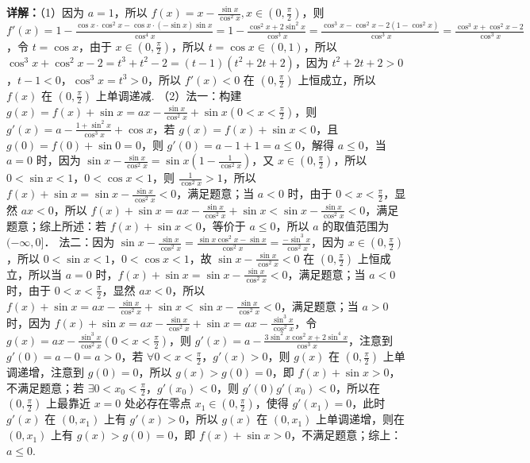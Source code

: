\begin{question}
\begin{solution}
\textbf{详解：}（1）因为 $a=1$，所以 $f(x)=x-\frac{\sin x}{\cos^2 x}, x\in(0,\frac{\pi}{2})$，则 $f'(x)=1-\frac{\cos x\cdot\cos^2 x-\cos x\cdot(-\sin x)\sin x}{\cos^4 x}=1-\frac{\cos^2 x+2\sin^2 x}{\cos^3 x}=\frac{\cos^3 x-\cos^2 x-2(1-\cos^2 x)}{\cos^3 x}=\frac{\cos^3 x+\cos^2 x-2}{\cos^3 x}$，令 $t=\cos x$，由于 $x\in(0,\frac{\pi}{2})$，所以 $t=\cos x\in(0,1)$，所以 $\cos^3 x+\cos^2 x-2=t^3+t^2-2=(t-1)(t^2+2t+2)$，因为 $t^2+2t+2>0$，$t-1<0$，$\cos^3 x=t^3>0$，所以 $f'(x)<0$ 在 $(0,\frac{\pi}{2})$ 上恒成立，所以 $f(x)$ 在 $(0,\frac{\pi}{2})$ 上单调递减.
（2）法一：构建 $g(x)=f(x)+\sin x=ax-\frac{\sin x}{\cos^2 x}+\sin x(0<x<\frac{\pi}{2})$，则 $g'(x)=a-\frac{1+\sin^2 x}{\cos^3 x}+\cos x$，若 $g(x)=f(x)+\sin x<0$，且 $g(0)=f(0)+\sin0=0$，则 $g'(0)=a-1+1=a\le0$，解得 $a\le0$，当 $a=0$ 时，因为 $\sin x-\frac{\sin x}{\cos^2 x}=\sin x\left(1-\frac{1}{\cos^2 x}\right)$，又 $x\in(0,\frac{\pi}{2})$，所以 $0<\sin x<1$，$0<\cos x<1$，则 $\frac{1}{\cos^2 x}>1$，所以 $f(x)+\sin x=\sin x-\frac{\sin x}{\cos^2 x}<0$，满足题意；当 $a<0$ 时，由于 $0<x<\frac{\pi}{2}$，显然 $ax<0$，所以 $f(x)+\sin x=ax-\frac{\sin x}{\cos^2 x}+\sin x<\sin x-\frac{\sin x}{\cos^2 x}<0$，满足题意；综上所述：若 $f(x)+\sin x<0$，等价于 $a\le0$，所以 $a$ 的取值范围为 $(-\infty,0]$．
法二：因为 $\sin x-\frac{\sin x}{\cos^2 x}=\frac{\sin x\cos^2 x-\sin x}{\cos^2 x}=\frac{-\sin^3 x}{\cos^2 x}$，因为 $x\in(0,\frac{\pi}{2})$，所以 $0<\sin x<1$，$0<\cos x<1$，故 $\sin x-\frac{\sin x}{\cos^2 x}<0$ 在 $(0,\frac{\pi}{2})$ 上恒成立，所以当 $a=0$ 时，$f(x)+\sin x=\sin x-\frac{\sin x}{\cos^2 x}<0$，满足题意；当 $a<0$ 时，由于 $0<x<\frac{\pi}{2}$，显然 $ax<0$，所以 $f(x)+\sin x=ax-\frac{\sin x}{\cos^2 x}+\sin x<\sin x-\frac{\sin x}{\cos^2 x}<0$，满足题意；当 $a>0$ 时，因为 $f(x)+\sin x=ax-\frac{\sin x}{\cos^2 x}+\sin x=ax-\frac{\sin^3 x}{\cos^2 x}$，令 $g(x)=ax-\frac{\sin^3 x}{\cos^2 x}(0<x<\frac{\pi}{2})$，则 $g'(x)=a-\frac{3\sin^2 x\cos^2 x+2\sin^4 x}{\cos^3 x}$，注意到 $g'(0)=a-0=a>0$，若 $\forall0<x<\frac{\pi}{2}$，$g'(x)>0$，则 $g(x)$ 在 $(0,\frac{\pi}{2})$ 上单调递增，注意到 $g(0)=0$，所以 $g(x)>g(0)=0$，即 $f(x)+\sin x>0$，不满足题意；若 $\exists0<x_0<\frac{\pi}{2}$，$g'(x_0)<0$，则 $g'(0)g'(x_0)<0$，所以在 $(0,\frac{\pi}{2})$ 上最靠近 $x=0$ 处必存在零点 $x_1\in(0,\frac{\pi}{2})$，使得 $g'(x_1)=0$，此时 $g'(x)$ 在 $(0,x_1)$ 上有 $g'(x)>0$，所以 $g(x)$ 在 $(0,x_1)$ 上单调递增，则在 $(0,x_1)$ 上有 $g(x)>g(0)=0$，即 $f(x)+\sin x>0$，不满足题意；综上：$a\le0$.
\end{solution}
\end{question}

